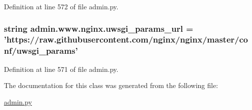 Definition at line 572 of file admin.\-py.

\hypertarget{classadmin_1_1www_1_1nginx_aec1e7959ddfe6598718fb6c8c9d72320}{
\subsubsection[{uwsgi\-\_\-params\-\_\-url}]{\setlength{\rightskip}{0pt plus 5cm}string admin.\-www.\-nginx.\-uwsgi\-\_\-params\-\_\-url = 'https\-://raw.\-githubusercontent.\-com/{\bf nginx}/{\bf nginx}/master/conf/uwsgi\-\_\-params'\hspace{0.3cm}{\ttfamily [static]}}}\label{classadmin_1_1www_1_1nginx_aec1e7959ddfe6598718fb6c8c9d72320}


Definition at line 571 of file admin.\-py.



The documentation for this class was generated from the following file\-:\begin{DoxyCompactItemize}
\item 
\hyperlink{admin_8py}{admin.\-py}\end{DoxyCompactItemize}
